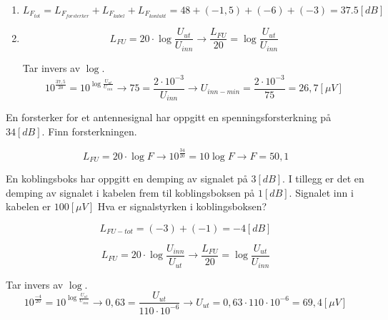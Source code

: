 \vspace{0.5cm} %

	\begin{solution}[name=Løsningsforslag oppgave]
		\begin{enumerate}[label=\roman*)]
		\item \[L_{F_{tot}}=L_{F_{forsterker}}+L_{F_{kabel}}+L_{F_{kontakt}} = 48+(-1,5)+(-6)+(-3) = 37.5[dB]\]
		\item \[L_{FU}=20 \cdot \log \frac{U_{ut}}{U_{inn}} \rightarrow \frac{L_{FU}}{20}= \log \frac{U_{ut}}{U_{inn}}\]

Tar invers av $\log$.
\[10^{\frac{37,5}{20}}=10^{\log \frac{U_{ut}}{U_{inn}}} \rightarrow 75=\frac{2 \cdot 10^{-3}}{U_{inn}} \rightarrow U_{inn-min}=\frac{2 \cdot 10^{-3}}{75}=26,7[ \mu V]\]

	\end{enumerate}

\end{solution}

\begin{question}[name=Oppgave, topic=forsterkning]
En forsterker for et antennesignal har oppgitt en spenningsforsterkning på $34[dB]$. Finn forsterkningen.

\end{question}

\vspace{0.5cm} %

\begin{solution}[name=Løsningsforslag oppgave]
\[L_{FU}=20 \cdot \log F \rightarrow 10^{\frac{34}{20}}= 10 \log F \rightarrow F=50,1 \]

\end{solution}

\begin{question}[name=Oppgave, topic=forsterkning]
En koblingsboks har oppgitt en demping av signalet på $3[dB]$. I tillegg er det en demping av signalet i kabelen frem til koblingsboksen på $1[dB]$. Signalet inn i kabelen er $100[\mu V]$ Hva er signalstyrken i koblingsboksen?

\end{question}

\vspace{0.5cm} %

\begin{solution}[name=Løsningsforslag oppgave]
\[L_{FU-tot}=(-3)+(-1)=-4[dB]\]

\[L_{FU} = 20 \cdot \log \frac{U_{inn}}{U_{ut}} \rightarrow \frac{L_{FU}}{20}= \log \frac{U_{ut}}{U_{inn}}\]

Tar invers av $\log$.
\[10^{\frac{-4}{20}}=10^{\log \frac {U_{ut}}{U_{inn}}} \rightarrow 0,63 = \frac{U_{ut}}{110 \cdot 10^{-6}} \rightarrow U_{ut}=0,63 \cdot 110 \cdot 10^{-6}=69,4[\mu V]\]


\end{solution}



\vspace{0.5cm} %